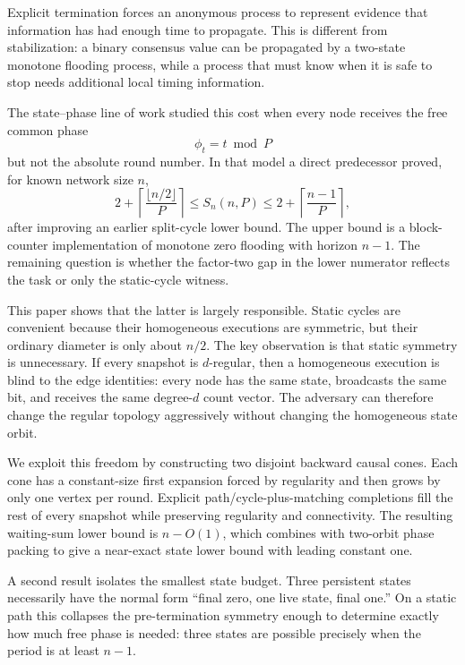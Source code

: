 \documentclass[11pt]{article}
\theoremstyle{remark}
\begin{document}
Explicit termination forces an anonymous process to represent evidence that information has
had enough time to propagate.  This is different from stabilization: a binary consensus
value can be propagated by a two-state monotone flooding process, while a process that must
know when it is safe to stop needs additional local timing information.

The state--phase line of work studied this cost when every node receives the free common
phase
\[
\phi_t=t\bmod P
\]
but not the absolute round number.  In that model a direct predecessor proved, for known
network size $n$,
\[
2+\left\lceil\frac{\lfloor n/2\rfloor}{P}\right\rceil
\le S_n(n,P)\le
2+\left\lceil\frac{n-1}{P}\right\rceil,
\]
after improving an earlier split-cycle lower bound.  The upper bound is a block-counter
implementation of monotone zero flooding with horizon $n-1$.  The remaining question is
whether the factor-two gap in the lower numerator reflects the task or only the static-cycle
witness.

This paper shows that the latter is largely responsible.  Static cycles are convenient
because their homogeneous executions are symmetric, but their ordinary diameter is only
about $n/2$.  The key observation is that static symmetry is unnecessary.  If every
snapshot is $d$-regular, then a homogeneous execution is blind to the edge identities:
every node has the same state, broadcasts the same bit, and receives the same degree-$d$
count vector.  The adversary can therefore change the regular topology aggressively without
changing the homogeneous state orbit.

We exploit this freedom by constructing two disjoint backward causal cones.  Each cone has
a constant-size first expansion forced by regularity and then grows by only one vertex per
round.  Explicit path/cycle-plus-matching completions fill the rest of every snapshot while
preserving regularity and connectivity.  The resulting waiting-sum lower bound is
$n-O(1)$, which combines with two-orbit phase packing to give a near-exact state lower
bound with leading constant one.

A second result isolates the smallest state budget.  Three persistent states necessarily
have the normal form ``final zero, one live state, final one.''  On a static path this
collapses the pre-termination symmetry enough to determine exactly how much free phase is
needed: three states are possible precisely when the period is at least $n-1$.
\end{document}
